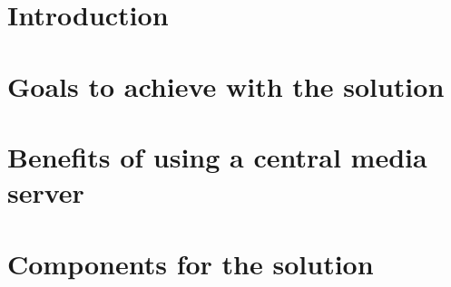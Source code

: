 \documentclass[../../thesis.tex]{subfiles}
\begin{document}
\chapter{Introduction}

\edef\folder{\currfolder/01_introduction}



\chapter{Goals to achieve with the solution}
\def\folder{\currfolder/02_goals}





\chapter{Benefits of using a central media server}
\edef\folder{\currfolder/03_reasons_ms}

\clearpage


\chapter{Components for the solution}
\edef\folder{\currfolder/04_components}





\end{document}

